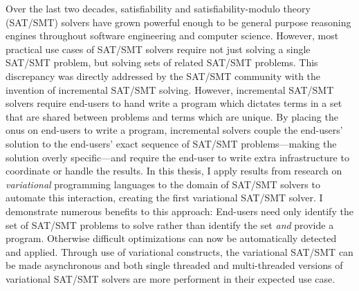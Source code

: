 Over the last two decades, satisfiability and satisfiability-modulo theory
(SAT/SMT) solvers have grown powerful enough to be general purpose reasoning
engines throughout software engineering and computer science. However, most
practical use cases of SAT/SMT solvers require not just solving a single SAT/SMT
problem, but solving sets of related SAT/SMT problems. This discrepancy was
directly addressed by the SAT/SMT community with the invention of incremental
SAT/SMT solving. However, incremental SAT/SMT solvers require end-users to hand
write a program which dictates terms in a set that are shared between problems
and terms which are unique. By placing the onus on end-users to write a program,
incremental solvers couple the end-users' solution to the end-users' exact
sequence of SAT/SMT problems---making the solution overly specific---and require
the end-user to write extra infrastructure to coordinate or handle the results.
In this thesis, I apply results from research on \emph{variational} programming
languages to the domain of SAT/SMT solvers to automate this interaction,
creating the first variational SAT/SMT solver. I demonstrate numerous benefits
to this approach: End-users need only identify the set of SAT/SMT problems to
solve rather than identify the set \emph{and} provide a program. Otherwise
difficult optimizations can now be automatically detected and applied. Through
use of variational constructs, the variational SAT/SMT can be made asynchronous
and both single threaded and multi-threaded versions of variational SAT/SMT
solvers are more performent in their expected use case.

